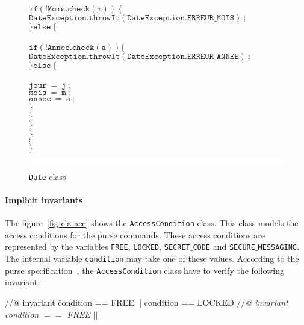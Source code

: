 \documentclass[a4paper]{llncs}
\begin{document}
\begin{center}
\begin{figure}[hbt]
\begin{tabbing}
\>\> \\
\>\>\>$\mathtt{if(!Mois.check(m))\ \{}$\\
\>\>\>\>$\mathtt{DateException.throwIt(DateException.ERREUR\_MOIS)\ ;}$ \\
\>\>\>$\mathtt{\}else\ \{}$ \\
\>\>\> \\
\>\>\>\>$\mathtt{if(!Annee.check(a)) \{}$ \\
\>\>\>\>\>$\mathtt{DateException.throwIt(DateException.ERREUR\_ANNEE)\ ;}$ \\
\>\>\>\>$\mathtt{\}else\ \{}$ \\
\>\>\>\> \\
\>\>\>\>\>$\mathtt{jour\ =\ j\ ;} $\\
\>\>\>\>\>$\mathtt{mois\ =\ m\ ;} $\\
\>\>\>\>\>$\mathtt{annee\ =\ a\ ;} $\\
\>\>\>\>$\mathtt{\}}$ \\
\>\>\>$\mathtt{\}} $\\
\>\>$\mathtt{\}} $\\
\>$\mathtt{\}} $\\
\>$\vdots$ \\
$\mathtt{\}}$ \\
\end{tabbing}
\caption{{\tt Date} class}
\label{fig-cla-dat}
\rule{\linewidth}{0.3mm}
\end{figure}
\end{center}






\paragraph{Implicit invariants}
The figure~\ref{fig-cla-acc} shows the \texttt{AccessCondition}
class. This class models the access conditions for the purse
commands. These access conditions are represented by the variables
\texttt{FREE}, \texttt{LOCKED}, \texttt{SECRET$\_$CODE} and
\texttt{SECURE$\_$MESSAGING}. The internal variable \texttt{condition} 
may take one of these values. According to the purse
specification~\cite{BMGL00}, the \texttt{AccessCondition} class have
to verify the following invariant$:$ 

\begin{tabbing}
//@ invariant \=condition == FREE || condition == LOCKED \kill
{\it $\slash\slash$@ invariant condition $==$ FREE $||$} \\
 \\
 \\
 \\
 \\
\end{tabbing}
\end{document}

